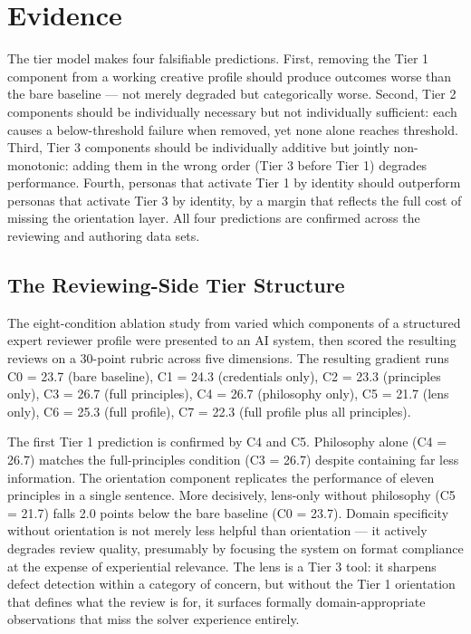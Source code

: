 \section{Evidence}
\label{sec:evidence}

The tier model makes four falsifiable predictions. First, removing the Tier 1 component
from a working creative profile should produce outcomes worse than the bare baseline ---
not merely degraded but categorically worse. Second, Tier 2 components should be
individually necessary but not individually sufficient: each causes a below-threshold
failure when removed, yet none alone reaches threshold. Third, Tier 3 components should
be individually additive but jointly non-monotonic: adding them in the wrong order (Tier
3 before Tier 1) degrades performance. Fourth, personas that activate Tier 1 by identity
should outperform personas that activate Tier 3 by identity, by a margin that reflects
the full cost of missing the orientation layer. All four predictions are confirmed across
the reviewing and authoring data sets.

\subsection{The Reviewing-Side Tier Structure}

The eight-condition ablation study from \citeauthor{paper1} \cite{paper1} varied which
components of a structured expert reviewer profile were presented to an AI system, then
scored the resulting reviews on a 30-point rubric across five dimensions. The resulting
gradient runs C0 = 23.7 (bare baseline), C1 = 24.3 (credentials only), C2 = 23.3
(principles only), C3 = 26.7 (full principles), C4 = 26.7 (philosophy only), C5 = 21.7
(lens only), C6 = 25.3 (full profile), C7 = 22.3 (full profile plus all principles).

The first Tier 1 prediction is confirmed by C4 and C5. Philosophy alone (C4 = 26.7)
matches the full-principles condition (C3 = 26.7) despite containing far less information.
The orientation component replicates the performance of eleven principles in a single
sentence. More decisively, lens-only without philosophy (C5 = 21.7) falls 2.0 points
below the bare baseline (C0 = 23.7). Domain specificity without orientation is not merely
less helpful than orientation --- it actively degrades review quality, presumably by
focusing the system on format compliance at the expense of experiential relevance. The
lens is a Tier 3 tool: it sharpens defect detection within a category of concern, but
without the Tier 1 orientation that defines what the review is for, it surfaces formally
domain-appropriate observations that miss the solver experience entirely.

